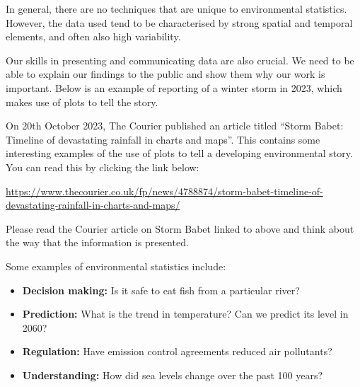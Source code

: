 \documentclass[
  letterpaper,
  DIV=11,
  numbers=noendperiod]{scrartcl}
\providecommand{\tightlist}{%
  \setlength{\itemsep}{0pt}\setlength{\parskip}{0pt}}\usepackage{longtable,booktabs,array}
\begin{document}
In general, there are no techniques that are unique to environmental
statistics. However, the data used tend to be characterised by strong
spatial and temporal elements, and often also high variability.

Our skills in presenting and communicating data are also crucial. We
need to be able to explain our findings to the public and show them why
our work is important. Below is an example of reporting of a winter
storm in 2023, which makes use of plots to tell the story.

\begin{tcolorbox}[enhanced jigsaw, opacityback=0, coltitle=black, opacitybacktitle=0.6, breakable, toprule=.15mm, bottomtitle=1mm, title={The Courier article on Storm Babet}, colback=white, leftrule=.75mm, titlerule=0mm, toptitle=1mm, arc=.35mm, bottomrule=.15mm, rightrule=.15mm, colframe=quarto-callout-note-color-frame, colbacktitle=quarto-callout-note-color!10!white, left=2mm]

On 20th October 2023, The Courier published an article titled ``Storm
Babet: Timeline of devastating rainfall in charts and maps''. This
contains some interesting examples of the use of plots to tell a
developing environmental story. You can read this by clicking the link
below:

\url{https://www.thecourier.co.uk/fp/news/4788874/storm-babet-timeline-of-devastating-rainfall-in-charts-and-maps/}

\end{tcolorbox}

\begin{tcolorbox}[enhanced jigsaw, opacityback=0, coltitle=black, opacitybacktitle=0.6, breakable, toprule=.15mm, bottomtitle=1mm, title={Exercise 3}, colback=white, leftrule=.75mm, titlerule=0mm, toptitle=1mm, arc=.35mm, bottomrule=.15mm, rightrule=.15mm, colframe=quarto-callout-tip-color-frame, colbacktitle=quarto-callout-tip-color!10!white, left=2mm]

Please read the Courier article on Storm Babet linked to above and think
about the way that the information is presented.

\end{tcolorbox}

Some examples of environmental statistics include:

\begin{itemize}
\tightlist
\item
  \textbf{Decision making:} Is it safe to eat fish from a particular
  river?
\item
  \textbf{Prediction:} What is the trend in temperature? Can we predict
  its level in 2060?
\item
  \textbf{Regulation:} Have emission control agreements reduced air
  pollutants?
\item
  \textbf{Understanding:} How did sea levels change over the past 100
  years?
\end{itemize}
\end{document}
